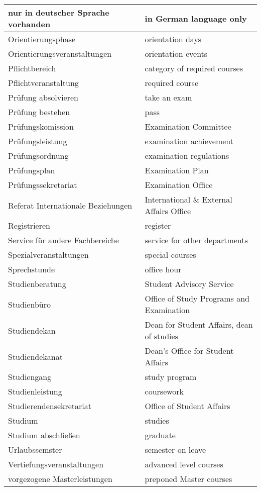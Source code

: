 \begin{longtable} {|p{.5\linewidth}|p{.5\linewidth}|}
\hline
nur in deutscher Sprache vorhanden & in German language only\\
\hline
Orientierungsphase & orientation days\\
\hline
Orientierungsveranstaltungen & orientation events\\
\hline
Pflichtbereich & category of required courses\\
\hline
Pflichtveranstaltung & required course\\
\hline
Prüfung absolvieren & take an exam\\
\hline
Prüfung bestehen & pass\\
\hline
Prüfungskomission & Examination Committee\\
\hline
Prüfungsleistung & examination achievement\\
\hline
Prüfungsordnung & examination regulations\\
\hline
Prüfungsplan & Examination Plan\\
\hline
Prüfungssekretariat & Examination Office\\
\hline
Referat Internationale Beziehungen & International \& External Affairs Office\\
\hline
Registrieren & register\\
\hline
Service für andere Fachbereiche & service for other departments\\
\hline
Spezialveranstaltungen & special courses\\
\hline
Sprechstunde & office hour\\
\hline
Studienberatung & Student Advisory Service\\
\hline
Studienbüro & Office of Study Programs and Examination\\
\hline
Studiendekan & Dean for Student Affairs, dean of studies\\
\hline
Studiendekanat & Dean's Office for Student Affairs\\
\hline
Studiengang & study program\\
\hline
Studienleistung & coursework\\
\hline
Studierendensekretariat & Office of Student Affairs\\
\hline
Studium & studies\\
\hline
Studium abschließen & graduate\\
\hline
Urlaubssemster & semester on leave\\
\hline
Vertiefungsveranstaltungen & advanced level courses\\
\hline
vorgezogene Masterleistungen & preponed Master courses\\

\end{longtable}
